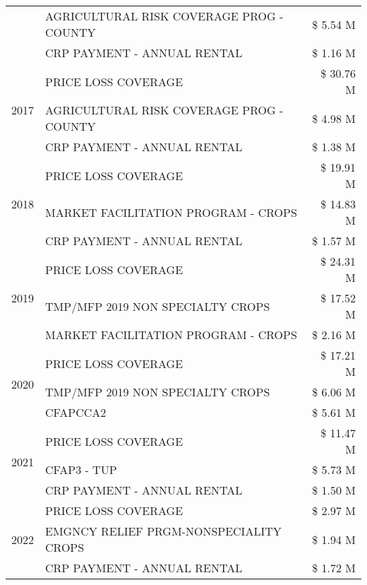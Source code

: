 \begin{tabular}{llr}
 & AGRICULTURAL RISK COVERAGE PROG - COUNTY & \$ 5.54 M \\
 & CRP PAYMENT - ANNUAL RENTAL & \$ 1.16 M \\
\cline{1-3}
\multirow[t]{3}{*}{2017} & PRICE LOSS COVERAGE & \$ 30.76 M \\
 & AGRICULTURAL RISK COVERAGE PROG - COUNTY & \$ 4.98 M \\
 & CRP PAYMENT - ANNUAL RENTAL & \$ 1.38 M \\
\cline{1-3}
\multirow[t]{3}{*}{2018} & PRICE LOSS COVERAGE & \$ 19.91 M \\
 & MARKET FACILITATION PROGRAM - CROPS & \$ 14.83 M \\
 & CRP PAYMENT - ANNUAL RENTAL & \$ 1.57 M \\
\cline{1-3}
\multirow[t]{3}{*}{2019} & PRICE LOSS COVERAGE & \$ 24.31 M \\
 & TMP/MFP 2019 NON SPECIALTY CROPS & \$ 17.52 M \\
 & MARKET FACILITATION PROGRAM - CROPS & \$ 2.16 M \\
\cline{1-3}
\multirow[t]{3}{*}{2020} & PRICE LOSS COVERAGE & \$ 17.21 M \\
 & TMP/MFP 2019 NON SPECIALTY CROPS & \$ 6.06 M \\
 & CFAPCCA2 & \$ 5.61 M \\
\cline{1-3}
\multirow[t]{3}{*}{2021} & PRICE LOSS COVERAGE & \$ 11.47 M \\
 & CFAP3 - TUP & \$ 5.73 M \\
 & CRP PAYMENT - ANNUAL RENTAL & \$ 1.50 M \\
\cline{1-3}
\multirow[t]{3}{*}{2022} & PRICE LOSS COVERAGE & \$ 2.97 M \\
 & EMGNCY RELIEF PRGM-NONSPECIALITY CROPS & \$ 1.94 M \\
 & CRP PAYMENT - ANNUAL RENTAL & \$ 1.72 M \\
\cline{1-3}
\bottomrule
\end{tabular}
